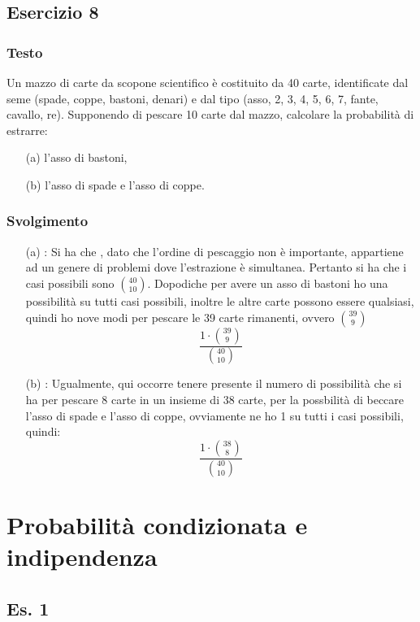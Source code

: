 \subsection{Esercizio 8}
\subsubsection{Testo}
Un mazzo di carte da scopone scientifico è costituito da 40 carte, identificate dal seme (spade, coppe, bastoni, denari) e dal tipo (asso, 2, 3, 4, 5, 6, 7, fante, cavallo, re). Supponendo di pescare 10 carte dal mazzo, calcolare la probabilità di estrarre:
\begin{itemize}
    \item[(a)] l'asso di bastoni,
    \item[(b)] l'asso di spade e l'asso di coppe.
\end{itemize}

\subsubsection{Svolgimento}

\begin{itemize}
  \item[(a)]: Si ha che , dato che l'ordine di pescaggio non è importante, appartiene ad un genere di problemi dove l'estrazione è simultanea. Pertanto si ha che i casi possibili sono $\binom{40}{10}$. Dopodiche per avere un asso di bastoni ho una possibilità su tutti casi possibili, inoltre le altre carte possono essere qualsiasi, quindi ho nove modi per pescare le 39 carte rimanenti, ovvero $\binom{39}{9}$
  \[
    \frac{1\cdot\binom{39}{9} }{\binom{40}{10}}
  \]
  \item[(b)]: Ugualmente, qui occorre tenere presente il numero di possibilità che si ha per pescare 8 carte in un insieme di 38 carte, per la possbilità di beccare l'asso di spade e l'asso di coppe, ovviamente ne ho 1 su tutti i casi possibili, quindi: 
  \[
    \frac{1\cdot \binom{38}{8}}{\binom{40}{10}}
  \]

\end{itemize}

\section{Probabilità condizionata e indipendenza}
\subsection{Es. 1}
